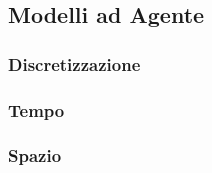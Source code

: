 \subsection{Modelli ad Agente}

\subsubsection{Discretizzazione}

\subsubsection*{Tempo}

\subsubsection*{Spazio}